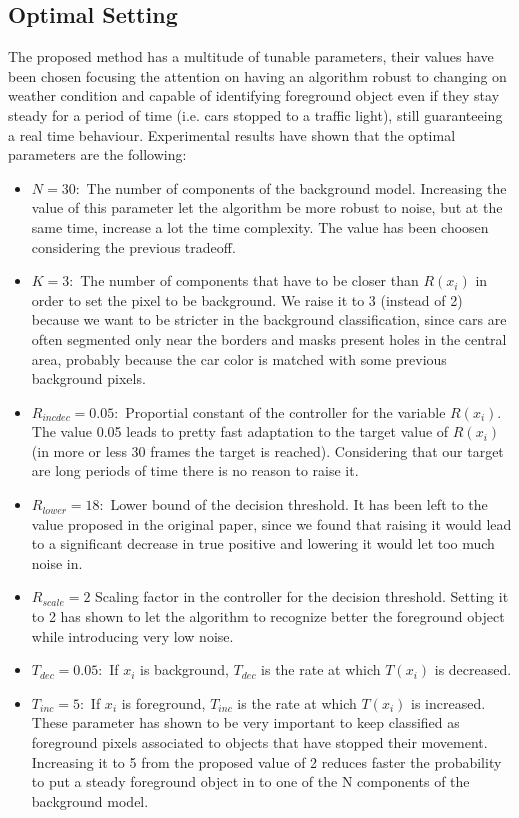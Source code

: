 \subsection{Optimal Setting}
The proposed method has a multitude of tunable parameters, their values have been chosen focusing the attention on having an algorithm robust to changing on weather condition and capable of identifying foreground object even if they stay steady for a period of time (i.e. cars stopped to a traffic light), still guaranteeing a real time behaviour. \newline
Experimental results have shown that the optimal parameters are the following:
\begin{itemize}
\item $N = 30:$ The number of components of the
background model. Increasing the value of this parameter let the algorithm be more robust to noise, but at the same time, increase a lot the time complexity. The value has been choosen considering the previous tradeoff.
\item $K = 3:$ The number of components that have to be closer than $R(x_i)$ in order to set the pixel to be background. We raise it to 3 (instead of 2) because we want to be stricter in the background classification, since cars are often segmented only near the borders and masks present holes in the central area, probably because the car color is matched with some previous background pixels.
\item $R_{incdec} = 0.05:$ Proportial constant of the controller for the variable $R(x_i)$. The value 0.05 leads to pretty fast adaptation to the target value of $R(x_i)$ (in more or less 30 frames the target is reached). Considering that our target are long periods of time there is no reason to raise it.
\item $R_{lower}=18:$ Lower bound of the decision threshold. It has been left to the value proposed in the original paper, since we found that raising it would lead to a significant decrease in true positive and lowering it would let too much noise in.
\item $R_{scale}=2$ Scaling factor in the controller for the decision threshold. Setting it to 2 has shown to let the algorithm to recognize better the foreground object while introducing very low noise.
\item $T_{dec} = 0.05:$ If $x_i$ is background, $T_{dec}$ is the rate at which $T(x_i)$ is decreased.
\item $T_{inc} = 5:$ If $x_i$ is foreground, $T_{inc}$ is the rate at which $T(x_i)$ is increased. These parameter has shown to be very important to keep classified as foreground pixels associated to objects that have stopped their movement. Increasing it to 5 from the proposed value of 2 reduces faster the probability to put a steady foreground object in to one of the N components of the background model.

\end{itemize}

